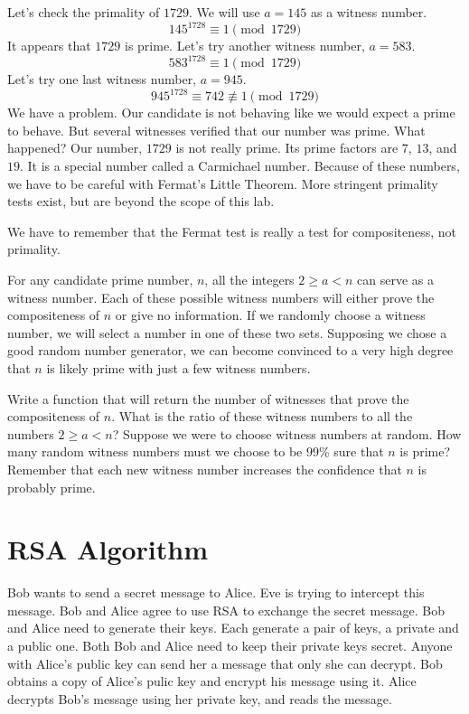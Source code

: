\begin{example}
Let's check the primality of $1729$.
We will use $a=145$ as a witness number.
\[
145^{1728} \equiv 1 \pmod{1729}
\]
It appears that $1729$ is prime.
Let's try another witness number, $a=583$.
\[
583^{1728} \equiv 1 \pmod{1729}
\]
Let's try one last witness number, $a=945$.
\[
945^{1728} \equiv 742 \not\equiv 1 \pmod{1729}
\]
We have a problem.  
Our candidate is not behaving like we would expect a prime to behave.
But several witnesses verified that our number was prime.  What happened?
Our number, $1729$ is not really prime.  Its prime factors are $7$, $13$, and $19$. 
It is a special number called a Carmichael number.
Because of these numbers, we have to be careful with Fermat's Little Theorem.
More stringent primality tests exist, but are beyond the scope of this lab.
\end{example}
We have to remember that the Fermat test is really a test for compositeness, not primality.

\begin{problem}
For any candidate prime number, $n$, all the integers $2 \geq a < n$ can serve as a witness number.
Each of these possible witness numbers will either prove the compositeness of $n$ or give no information.
If we randomly choose a witness number, we will select a number in one of these two sets.
Supposing we chose a good random number generator, we can become convinced to a very high degree that $n$ is likely prime with just a few witness numbers.

Write a function that will return the number of witnesses that prove the compositeness of $n$.
What is the ratio of these witness numbers to all the numbers $2 \geq a < n$?
Suppose we were to choose witness numbers at random.  
How many random witness numbers must we choose to be $99$\% sure that $n$ is prime?
Remember that each new witness number increases the confidence that $n$ is probably prime.
\label{prob:prime_confidence}
\end{problem}

\section*{RSA Algorithm}
Bob wants to send a secret message to Alice.
Eve is trying to intercept this message.
Bob and Alice agree to use RSA to exchange the secret message.
Bob and Alice need to generate their keys.
Each generate a pair of keys, a private and a public one.
Both Bob and Alice need to keep their private keys secret.
Anyone with Alice's public key can send her a message that only she can decrypt.
Bob obtains a copy of Alice's pulic key and encrypt his message using it.
Alice decrypts Bob's message using her private key, and reads the message.

